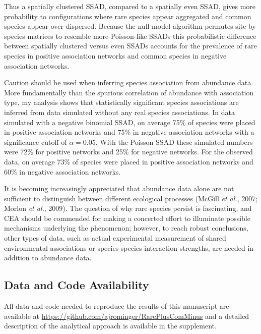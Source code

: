 \documentclass[
]{article}
\begin{document}
Thus a spatially clustered SSAD, compared to a spatially even SSAD,
gives more probability to configurations where rare species appear
aggregated and common species appear over-dispersed. Because the null
model algorithm permutes site by species matrices to resemble more
Poisson-like SSADs this probabilistic difference between spatially
clustered versus even SSADs accounts for the prevalence of rare species
in positive association networks and common species in negative
association networks.

Caution should be used when inferring species association from abundance
data. More fundamentally than the spurious correlation of abundance with
association type, my analysis shows that statistically significant
species associations are inferred from data simulated without any real
species associations. In data simulated with a negative binomial SSAD,
on average 75\% of species were placed in positive association networks
and 75\% in negative association networks with a significance cutoff of
\(\alpha = 0.05\). With the Poisson SSAD these simulated numbers were
72\% for positive networks and 25\% for negative networks. For the
observed data, on average 73\% of species were placed in positive
association networks and 60\% in negative association networks.

It is becoming increasingly appreciated that abundance data alone are
not sufficient to distinguish between different ecological processes
(McGill \emph{et al.}, 2007; Morlon \emph{et al.}, 2009). The question
of why rare species persist is fascinating, and CEA should be commended
for making a concerted effort to illuminate possible mechanisms
underlying the phenomenon; however, to reach robust conclusions, other
types of data, such as actual experimental measurement of shared
environmental associations or species-species interaction strengths, are
needed in addition to abundance data.

\hypertarget{data-and-code-availability}{%
\subsection{Data and Code
Availability}\label{data-and-code-availability}}

All data and code needed to reproduce the results of this manuscript are
available at \url{https://github.com/ajrominger/RarePlusComMinus} and a
detailed description of the analytical approach is available in the
supplement.

\clearpage
\end{document}
